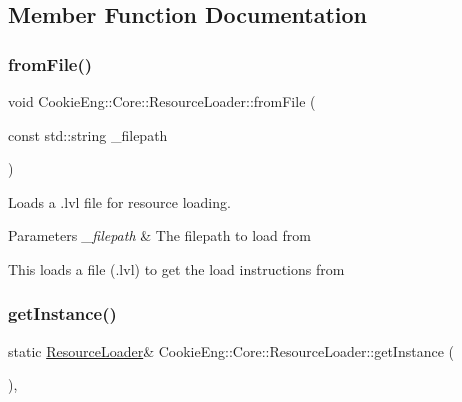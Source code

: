 \subsection{Member Function Documentation}
\mbox{\label{class_cookie_eng_1_1_core_1_1_resource_loader_aaa1dfd99e22dd76e5c53783afc9a0b0f}} 
\subsubsection{\texorpdfstring{from\+File()}{fromFile()}}
{\footnotesize\ttfamily void Cookie\+Eng\+::\+Core\+::\+Resource\+Loader\+::from\+File (\begin{DoxyParamCaption}\item[{const std\+::string}]{\+\_\+filepath }\end{DoxyParamCaption})}



Loads a .lvl file for resource loading. 


\begin{DoxyParams}{Parameters}
{\em \+\_\+filepath} & The filepath to load from\\
\hline
\end{DoxyParams}
This loads a file (.lvl) to get the load instructions from \mbox{\label{class_cookie_eng_1_1_core_1_1_resource_loader_a6830c862ac1d34c4a4f9c9e4299003a8}} 
\subsubsection{\texorpdfstring{get\+Instance()}{getInstance()}}
{\footnotesize\ttfamily static \hyperlink{class_cookie_eng_1_1_core_1_1_resource_loader}{Resource\+Loader}\& Cookie\+Eng\+::\+Core\+::\+Resource\+Loader\+::get\+Instance (\begin{DoxyParamCaption}{ }\end{DoxyParamCaption})\hspace{0.3cm}{\ttfamily [inline]}, {\ttfamily [static]}}



